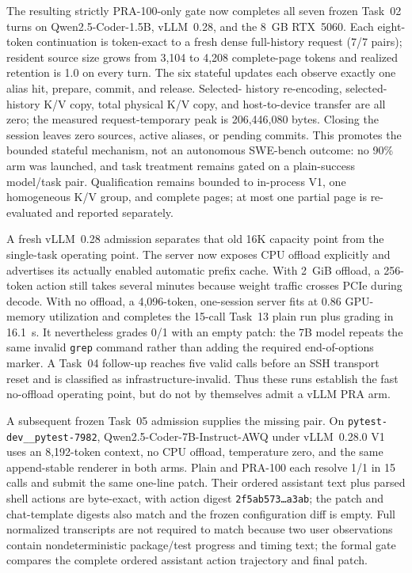 \documentclass[11pt]{article}
\begin{document}
The resulting strictly PRA-100-only gate now completes all seven frozen
Task~02 turns on Qwen2.5-Coder-1.5B, vLLM~0.28, and the 8~GB RTX~5060.  Each
eight-token continuation is token-exact to a fresh dense full-history request
(7/7 pairs); resident source size grows from 3,104 to 4,208 complete-page
tokens and realized retention is 1.0 on every turn.  The six stateful updates
each observe exactly one alias hit, prepare, commit, and release.  Selected-
history re-encoding, selected-history K/V copy, total physical K/V copy, and
host-to-device transfer are all zero; the measured request-temporary peak is
206,446,080 bytes.  Closing the session leaves zero sources, active aliases,
or pending commits.  This promotes the bounded stateful mechanism, not an
autonomous SWE-bench outcome: no 90\% arm was launched, and task treatment
remains gated on a plain-success model/task pair.  Qualification remains
bounded to in-process V1, one homogeneous K/V group, and complete pages; at
most one partial page is re-evaluated and reported separately.

A fresh vLLM~0.28 admission separates that old 16K capacity point from the
single-task operating point.  The server now exposes CPU offload explicitly
and advertises its actually enabled automatic prefix cache.  With 2~GiB
offload, a 256-token action still takes several minutes because weight traffic
crosses PCIe during decode.  With no offload, a 4,096-token, one-session server
fits at 0.86 GPU-memory utilization and completes the 15-call Task~13 plain run
plus grading in 16.1~s.  It nevertheless grades 0/1 with an empty patch: the 7B
model repeats the same invalid \texttt{grep} command rather than adding the
required end-of-options marker.  A Task~04 follow-up reaches five valid calls
before an SSH transport reset and is classified as infrastructure-invalid.
Thus these runs establish the fast no-offload operating point, but do not by
themselves admit a vLLM PRA arm.

A subsequent frozen Task~05 admission supplies the missing pair.  On
\texttt{pytest-dev\_\_pytest-7982}, Qwen2.5-Coder-7B-Instruct-AWQ under
vLLM~0.28.0 V1 uses an 8,192-token context, no CPU offload, temperature zero,
and the same append-stable renderer in both arms.  Plain and PRA-100 each
resolve 1/1 in 15 calls and submit the same one-line patch.  Their ordered
assistant text plus parsed shell actions are byte-exact, with action digest
\texttt{2f5ab573\ldots a3ab}; the patch and chat-template digests also match and
the frozen configuration diff is empty.  Full normalized transcripts are not
required to match because two user observations contain nondeterministic
package/test progress and timing text; the formal gate compares the complete
ordered assistant action trajectory and final patch.
\end{document}
